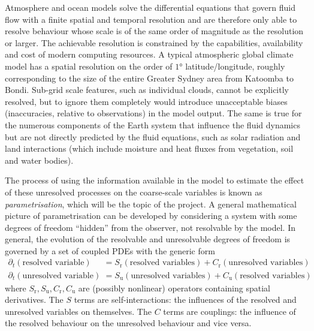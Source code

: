 \documentclass[titlepage]{article}
\begin{document}
Atmosphere and ocean models solve the differential equations that govern fluid
flow with a finite spatial and temporal resolution and are therefore only able
to resolve behaviour whose scale is of the same order of magnitude as the
resolution or larger. The achievable resolution is constrained by the
capabilities, availability and cost of modern computing resources. A typical
atmospheric global climate model has a spatial resolution on the order of
$\ang{1}$ latitude/longitude, roughly corresponding to the size of the entire
Greater Sydney area from Katoomba to Bondi. Sub-grid scale features, such as
individual clouds, cannot be explicitly resolved, but to ignore them completely
would introduce unacceptable biases (inaccuracies, relative to observations)
in the model output. %
The same is true for the numerous components of the Earth system that influence
the fluid dynamics but are not directly predicted by the fluid equations, such
as solar radiation and land interactions (which include moisture and heat
fluxes from vegetation, soil and water bodies).

The process of using the information available in the model to estimate the
effect of these unresolved processes on the coarse-scale variables is known as
\emph{parametrisation}, which will be the topic of the project. A general
mathematical picture of parametrisation can be developed by considering a
system with some degrees of freedom ``hidden'' from the observer, not
resolvable by the model. In general, the evolution of the resolvable and
unresolvable degrees of freedom is governed by a set of coupled PDEs with the
generic form
\begin{subequations} \label{eqn:coupled_system}
\begin{align}
    \label{eqn:resolved}
    \partial_t (\text{resolved variable})
        &= S_\mathrm{r}(\text{resolved variables})
        + C_\mathrm{r}(\text{unresolved variables}) \\
    \label{eqn:unresolved}
    \partial_t (\text{unresolved variable})
        &= S_\mathrm{u}(\text{unresolved variables})
        + C_\mathrm{u}(\text{resolved variables})
\end{align}
\end{subequations}
where $S_\mathrm{r},S_\mathrm{u},C_\mathrm{r},C_\mathrm{u}$ are (possibly
nonlinear) operators containing spatial derivatives. The $S$ terms are
self-interactions: the influences of the resolved and unresolved variables on
themselves. The $C$ terms are couplings: the influence of the resolved
behaviour on the unresolved behaviour and vice versa.
\end{document}
